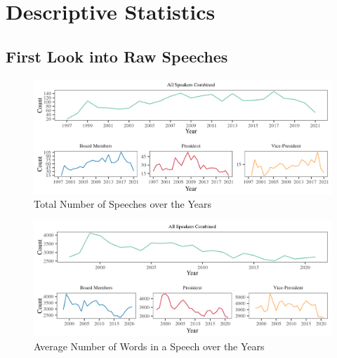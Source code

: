 \section{Descriptive Statistics}

\subsection{First Look into Raw Speeches}

\begin{figure}[H]
    \includegraphics[width = \textwidth]{figures/figcombo3.png}
    \vspace{-9mm}
    \caption{Total Number of Speeches over the Years}
    \label{fig:figcombo3}  
\end{figure}

\begin{figure}[H]
    \includegraphics[width = \textwidth]{figures/figcombo1.png}
    \vspace{-9mm}
    \caption{Average Number of Words in a Speech over the Years}
    \label{fig:figcombo1}  
\end{figure}

